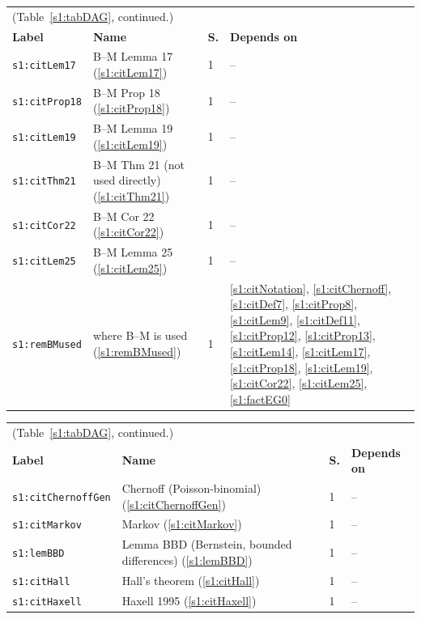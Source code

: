 \begin{center}
{\footnotesize
\setlength{\tabcolsep}{3pt}
\begin{tabular}{p{3.2cm}p{3.6cm}p{0.5cm}p{7.6cm}}
\multicolumn{4}{l}{(Table~\ref{s1:tabDAG}, continued.)}\\
\textbf{Label} & \textbf{Name} & \textbf{S.} & \textbf{Depends on}\\
\hline
\texttt{s1:citLem17} & B--M Lemma 17 (\ref{s1:citLem17}) & 1 & --\\
\texttt{s1:citProp18} & B--M Prop 18 (\ref{s1:citProp18}) & 1 & --\\
\texttt{s1:citLem19} & B--M Lemma 19 (\ref{s1:citLem19}) & 1 & --\\
\texttt{s1:citThm21} & B--M Thm 21 (not used directly) (\ref{s1:citThm21}) & 1 & --\\
\texttt{s1:citCor22} & B--M Cor 22 (\ref{s1:citCor22}) & 1 & --\\
\texttt{s1:citLem25} & B--M Lemma 25 (\ref{s1:citLem25}) & 1 & --\\
\texttt{s1:remBMused} & where B--M is used (\ref{s1:remBMused}) & 1 & \ref{s1:citNotation}, \ref{s1:citChernoff}, \ref{s1:citDef7}, \ref{s1:citProp8}, \ref{s1:citLem9}, \ref{s1:citDef11}, \ref{s1:citProp12}, \ref{s1:citProp13}, \ref{s1:citLem14}, \ref{s1:citLem17}, \ref{s1:citProp18}, \ref{s1:citLem19}, \ref{s1:citCor22}, \ref{s1:citLem25}, \ref{s1:factEG0}\\
\hline
\end{tabular}}
\end{center}

\begin{center}
{\footnotesize
\setlength{\tabcolsep}{3pt}
\begin{tabular}{p{3.2cm}p{3.6cm}p{0.5cm}p{7.6cm}}
\multicolumn{4}{l}{(Table~\ref{s1:tabDAG}, continued.)}\\
\textbf{Label} & \textbf{Name} & \textbf{S.} & \textbf{Depends on}\\
\hline
\texttt{s1:citChernoffGen} & Chernoff (Poisson-binomial) (\ref{s1:citChernoffGen}) & 1 & --\\
\texttt{s1:citMarkov} & Markov (\ref{s1:citMarkov}) & 1 & --\\
\texttt{s1:lemBBD} & Lemma BBD (Bernstein, bounded differences) (\ref{s1:lemBBD}) & 1 & --\\
\texttt{s1:citHall} & Hall's theorem (\ref{s1:citHall}) & 1 & --\\
\texttt{s1:citHaxell} & Haxell 1995 (\ref{s1:citHaxell}) & 1 & --\\
\hline
\end{tabular}}
\end{center}

